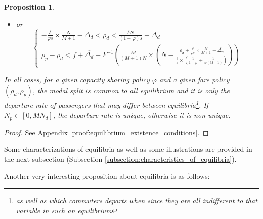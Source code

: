 \documentclass[english, a4paper]{article}
\theoremstyle{plain}
\newtheorem{proposition}{Proposition}
\theoremstyle{definition}
\theoremstyle{remark}
\begin{document}
\begin{proposition}
\begin{itemize}
\begin{itemize}
\begin{equation*}
                \left\{
                \begin{array}{l}
                    \rho _d \leq - \frac{\delta}{\varphi s}\times \frac{N}{M+1} - \overline{\Delta _d}\\
                    \rho _p - \rho _d < f + \overline{\Delta _d} - F^{-1}\left(\frac{M}{M + 1}\right)
                \end{array}
                \right.
            \end{equation*}
            \item or \begin{equation*}
                \left\{
                \begin{array}{l}
                    -\frac{\delta}{\varphi s}\times \frac{N}{M+1} - \overline{\Delta _d} < \rho _d < \frac{\delta N}{(1-\varphi ) s} - \overline{\Delta _d}\\
                    \rho _p - \rho _d < f + \overline{\Delta _d} - F^{-1}\left( \frac{M}{(M+1)N} \times \left( N - \frac{\rho_d + \frac{\delta}{\varphi s}\times \frac{N}{M+1} + \overline{\Delta _d}}{\frac{\delta}{s}\times \left( \frac{1}{1-\varphi} + \frac{1}{\varphi (M+1)} \right)} \right)\right)
                \end{array}
                \right.
        \end{equation*}
        \end{itemize}
    \end{itemize}
    In all cases, for a given capacity sharing policy $\varphi$ and a given fare policy $(\rho_d, \rho_p)$, the modal split is common to all equilibrium and it is only the departure rate of passengers that may differ between equilibria\footnote{as well as which commuters departs when since they are all indifferent to that variable in such an equilibrium}. If $N_p \in [0, MN_d]$, the departure rate is unique, otherwise it is non unique.
\end{proposition}

\begin{proof}
    See Appendix \ref{proof:equilibrium_existence_conditions}.
\end{proof}

Some characterizations of equilibria as well as some illustrations are provided in the next subsection (Subsection \ref{subsection:characteristics_of_equilibria}).

Another very interesting proposition about equilibria is as follows:
\end{document}
